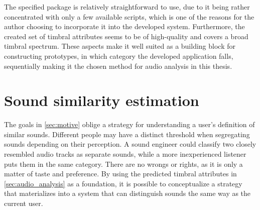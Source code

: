 The specified package is relatively straightforward to use, due to it being rather concentrated with only a few available scripts, which is one of the reasons for the author choosing to incorporate it into the developed system. Furthermore, the created set of timbral attributes seems to be of high-quality and covers a broad timbral spectrum. These aspects make it well suited as a building block for constructing prototypes, in which category the developed application falls, sequentially making it the chosen method for audio analysis in this thesis.

\section{Sound similarity estimation}\label{sec:sound_similarity_estimation}
The goals in \cref{sec:motive} oblige a strategy for understanding a user's definition of similar sounds. Different people may have a distinct threshold when segregating sounds depending on their perception. A sound engineer could classify two closely resembled audio tracks as separate sounds, while a more inexperienced listener puts them in the same category. There are no wrongs or rights, as it is only a matter of taste and preference. By using the predicted timbral attributes in \cref{sec:audio_analysis} as a foundation, it is possible to conceptualize a strategy that materializes into a system that can distinguish sounds the same way as the current user.

